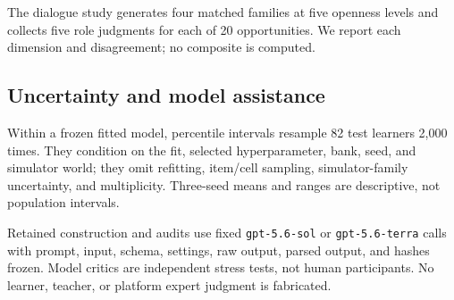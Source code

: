 The dialogue study generates four matched families at five openness levels and
collects five role judgments for each of 20 opportunities.  We report each
dimension and disagreement; no composite is computed.

\subsection{Uncertainty and model assistance}

Within a frozen fitted model, percentile intervals resample 82 test learners
2,000 times.  They condition on the fit, selected hyperparameter, bank, seed,
and simulator world; they omit refitting, item/cell sampling, simulator-family
uncertainty, and multiplicity.  Three-seed means and ranges are descriptive,
not population intervals.

Retained construction and audits use fixed \texttt{gpt-5.6-sol} or
\texttt{gpt-5.6-terra} calls with prompt, input, schema, settings, raw output,
parsed output, and hashes frozen.  Model critics are independent stress tests,
not human participants.  No learner, teacher, or platform expert judgment is
fabricated.
